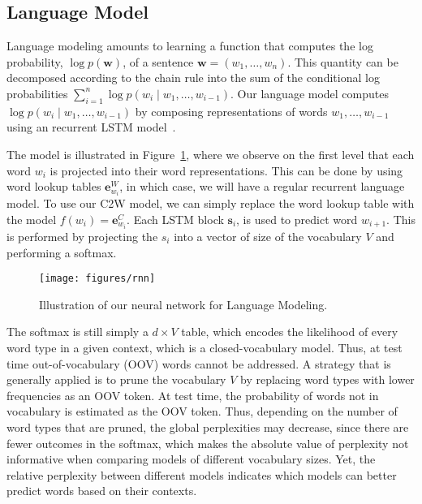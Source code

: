 \documentclass[11pt]{article}
\begin{document}
\begin{CJK*}{UTF8}{gbsn}
\subsection{Language Model}
Language modeling amounts to learning a function that computes the log probability, $\log p(\boldsymbol{w})$, of a sentence $\boldsymbol{w}=(w_1,\ldots,w_n)$. This quantity can be decomposed according to the chain rule into the sum of the conditional log probabilities $\sum_{i=1}^{n} \log p(w_i \mid w_1,\ldots,w_{i-1})$. Our language model computes $\log p(w_i \mid w_1,\ldots,w_{i-1})$ by composing representations of words $w_1,\ldots,w_{i-1}$ using an recurrent LSTM model~\cite{mikolov2010recurrent,sundermeyer12:lstm}.

The model is illustrated in Figure~\ref{lm}, where we observe on the first level that each word $w_i$ is projected into their word representations. This can be done by using word lookup tables $\mathbf{e}^W_{w_i}$, in which case, we will have a regular recurrent language model. To use our C2W model, we can simply replace the word lookup table with the model $f(w_i)=\mathbf{e}^C_{w_i}$. Each LSTM block $\mathbf{s}_i$, is used to predict word $w_{i+1}$. This is performed by projecting the $s_i$ into a vector of size of the vocabulary $V$ and performing a softmax.

\begin{figure}[ht]
\begin{center}
\centerline{\texttt{[image: figures/rnn]}}
\caption{Illustration of our neural network for Language Modeling.}
\label{lm}
\end{center}
\end{figure} 


The softmax is still simply a $d\times V$ table, which encodes the likelihood of every word type in a given context, which is a closed-vocabulary model. Thus, at test time out-of-vocabulary (OOV) words cannot be addressed. A strategy that is generally applied is to prune the vocabulary $V$ by replacing word types with lower frequencies as an OOV token. At test time, the probability of words not in vocabulary is estimated as the OOV token. Thus, depending on the number of word types that are pruned, the global perplexities may decrease, since there are fewer outcomes in the softmax, which makes the absolute value of perplexity not informative when comparing models of different vocabulary sizes. Yet, the relative perplexity between different models indicates which models can better predict words based on their contexts. 


\end{CJK*}
\end{document}
